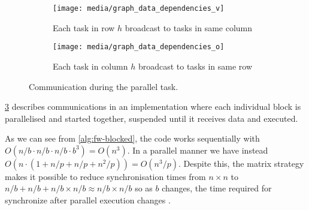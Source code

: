 \begin{figure}[htbp]
    \centering
    \begin{subfigure}[t]{0.4\textwidth}
        \centering
        \texttt{[image: media/graph\_data\_dependencies\_v]}
        \caption{Each task in row \(h\) broadcast to tasks in same column}
        \label{fig:data-dependencies-v}
    \end{subfigure}
    \begin{subfigure}[t]{0.4\textwidth}
        \centering
        \texttt{[image: media/graph\_data\_dependencies\_o]}
        \caption{Each task in column \(h\) broadcast to tasks in same row}
        \label{fig:data-dependencies-o}
    \end{subfigure}
    \caption{Communication during the parallel task.}
    \label{fig:communication-during-parallel-task}
\end{figure}

\cref{fig:communication-during-parallel-task}  describes communications in an implementation where each individual block is parallelised and started together, suspended until it receives data and executed.

As we can see from \cref{alg:fw-blocked}, the code works sequentially with \(O(n/b \cdot n/b \cdot n/b \cdot b^3) =O(n^3) \).
In a parallel manner we have instead \(O(n \cdot (1+n/p+n/p+ n^2/p)) = O(n^3/p)\).
Despite this, the matrix strategy makes it possible to reduce synchronisation times from \(n\times n\) to \(n/b + n/b + n/b \times n/b \approx n/b \times n/b\) so as \(b\) changes, the time required for synchronize after parallel execution changes \cite{rucci}.

\FloatBarrier
